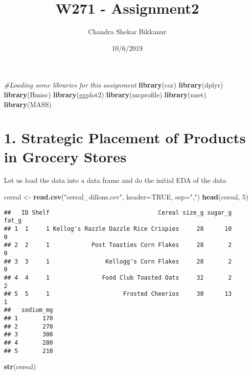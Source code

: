 \documentclass[]{article}
\title{W271 - Assignment2}
\author{Chandra Shekar Bikkanur}
\date{10/6/2019}
\newenvironment{Shaded}{\begin{snugshade}}{\end{snugshade}}
\newcommand{\CommentTok}[1]{\textcolor[rgb]{0.56,0.35,0.01}{\textit{#1}}}
\newcommand{\DataTypeTok}[1]{\textcolor[rgb]{0.13,0.29,0.53}{#1}}
\newcommand{\DecValTok}[1]{\textcolor[rgb]{0.00,0.00,0.81}{#1}}
\newcommand{\KeywordTok}[1]{\textcolor[rgb]{0.13,0.29,0.53}{\textbf{#1}}}
\newcommand{\NormalTok}[1]{#1}
\newcommand{\OtherTok}[1]{\textcolor[rgb]{0.56,0.35,0.01}{#1}}
\newcommand{\StringTok}[1]{\textcolor[rgb]{0.31,0.60,0.02}{#1}}
\begin{document}
\maketitle

\begin{Shaded}
\begin{Highlighting}[]
\CommentTok{#Loading some libraries for this assignment}
\KeywordTok{library}\NormalTok{(car)}
\KeywordTok{library}\NormalTok{(dplyr)}
\KeywordTok{library}\NormalTok{(Hmisc)}
\KeywordTok{library}\NormalTok{(ggplot2)}
\KeywordTok{library}\NormalTok{(mcprofile)}
\KeywordTok{library}\NormalTok{(nnet)}
\KeywordTok{library}\NormalTok{(MASS)}
\end{Highlighting}
\end{Shaded}

\hypertarget{strategic-placement-of-products-in-grocery-stores}{%
\section{1. Strategic Placement of Products in Grocery
Stores}\label{strategic-placement-of-products-in-grocery-stores}}

Let us load the data into a data frame and do the initial EDA of the
data

\begin{Shaded}
\begin{Highlighting}[]
\NormalTok{cereal <-}\StringTok{ }\KeywordTok{read.csv}\NormalTok{(}\StringTok{"cereal_dillons.csv"}\NormalTok{, }\DataTypeTok{header=}\OtherTok{TRUE}\NormalTok{, }\DataTypeTok{sep=}\StringTok{","}\NormalTok{)}
\KeywordTok{head}\NormalTok{(cereal, }\DecValTok{5}\NormalTok{)}
\end{Highlighting}
\end{Shaded}

\begin{verbatim}
##   ID Shelf                               Cereal size_g sugar_g fat_g
## 1  1     1 Kellog's Razzle Dazzle Rice Crispies     28      10     0
## 2  2     1            Post Toasties Corn Flakes     28       2     0
## 3  3     1                Kellogg's Corn Flakes     28       2     0
## 4  4     1               Food Club Toasted Oats     32       2     2
## 5  5     1                     Frosted Cheerios     30      13     1
##   sodium_mg
## 1       170
## 2       270
## 3       300
## 4       280
## 5       210
\end{verbatim}

\begin{Shaded}
\begin{Highlighting}[]
\KeywordTok{str}\NormalTok{(cereal)}
\end{Highlighting}
\end{Shaded}
\end{document}
